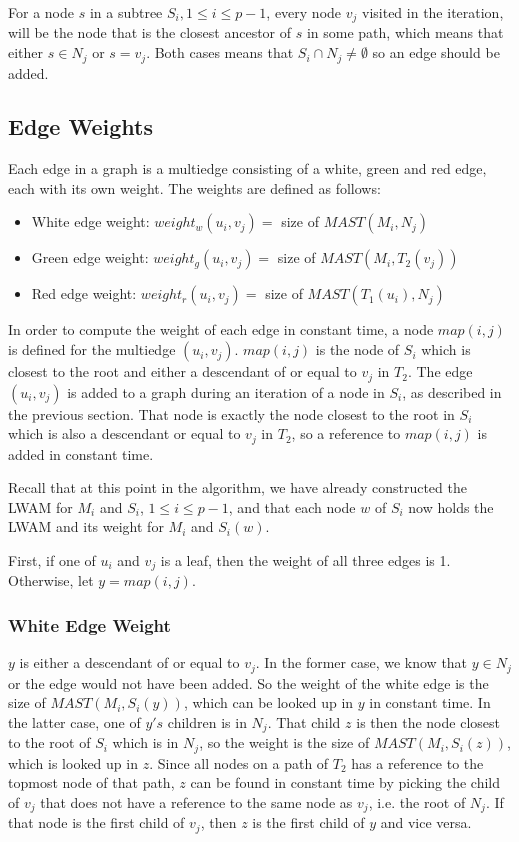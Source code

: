 For a node $s$ in a subtree $S_i, 1 \le i \le p-1$, every node $v_j$ visited in the iteration, will be the node that is the closest ancestor of $s$ in some path, which means that either $s \in N_j$ or $s=v_j$. Both cases means that $S_i \cap N_j \ne \emptyset$ so an edge should be added.

\subsection{Edge Weights}
Each edge in a graph is a multiedge consisting of a white, green and red edge, each with its own weight. The weights are defined as follows:
\begin{itemize}
	\item White edge weight: $weight_w(u_i, v_j)=$ size of $MAST(M_i,N_j)$
	\item Green edge weight: $weight_g(u_i, v_j)=$ size of $MAST(M_i,T_2(v_j))$
	\item Red edge weight: $weight_r(u_i, v_j)=$ size of $MAST(T_1(u_i),N_j)$
\end{itemize}

In order to compute the weight of each edge in constant time, a node $map(i,j)$ is defined for the multiedge $(u_i,v_j)$. $map(i,j)$ is the node of $S_i$ which is closest to the root and either a descendant of or equal to $v_j$ in $T_2$. The edge $(u_i,v_j)$ is added to a graph during an iteration of a node in $S_i$, as described in the previous section. That node is exactly the node closest to the root in $S_i$ which is also a descendant or equal to $v_j$ in $T_2$, so a reference to $map(i,j)$ is added in constant time.

Recall that at this point in the algorithm, we have already constructed the LWAM for $M_i$ and $S_i$, $1 \le i \le p-1$, and that each node $w$ of $S_i$ now holds the LWAM and its weight for $M_i$ and $S_i(w)$.

First, if one of $u_i$ and $v_j$ is a leaf, then the weight of all three edges is 1. Otherwise, let $y=map(i,j)$.

\subsubsection{White Edge Weight}
$y$ is either a descendant of or equal to $v_j$. In the former case, we know that $y \in N_j$ or the edge would not have been added. So the weight of the white edge is the size of $MAST(M_i, S_i(y))$, which can be looked up in $y$ in constant time. In the latter case, one of $y's$ children is in $N_j$. That child $z$ is then the node closest to the root of $S_i$ which is in $N_j$, so the weight is the size of $MAST(M_i, S_i(z))$, which is looked up in $z$. Since all nodes on a path of $T_2$ has a reference to the topmost node of that path, $z$ can be found in constant time by picking the child of $v_j$ that does not have a reference to the same node as $v_j$, i.e. the root of $N_j$. If that node is the first child of $v_j$, then $z$ is the first child of $y$ and vice versa.

